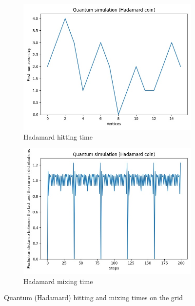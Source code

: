 \begin{figure}[H]
  \centering
  \begin{subfigure}{.45\linewidth}
    \centering
    \includegraphics[width=\linewidth]{./figures/results/grid/hadamard_hitting_time.jpg}
    \caption{Hadamard hitting time}
  \end{subfigure}
  \begin{subfigure}{.45\linewidth}
    \centering
    \includegraphics[width=\linewidth]{./figures/results/grid/hadamard_mixing_time.jpg}
    \caption{Hadamard mixing time}
  \end{subfigure}
  \caption{Quantum (Hadamard) hitting and mixing times on the grid}
\end{figure}

